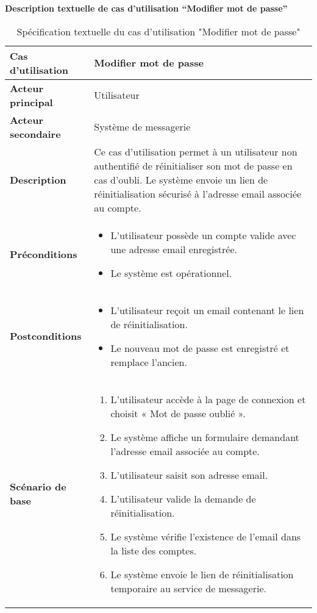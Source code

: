 \documentclass[a4paper,11pt]{report}
\begin{document}
\textbf{Description textuelle de cas d’utilisation “Modifier mot de passe”}

\begin{table}[H]
  \centering
  \renewcommand{\arraystretch}{1.5}
  \caption{Spécification textuelle du cas d'utilisation "Modifier mot de passe"}
  \begin{tabularx}{\textwidth}{|l|X|}
    \hline
    \textbf{Cas d'utilisation} & Modifier mot de passe \\ \hline
    \textbf{Acteur principal}  & Utilisateur \\ \hline
    \textbf{Acteur secondaire} & Système de messagerie \\ \hline
    \textbf{Description}       & Ce cas d'utilisation permet à un utilisateur non authentifié de réinitialiser son mot de passe en cas d'oubli. Le système envoie un lien de réinitialisation sécurisé à l'adresse email associée au compte. \\ \hline
    \textbf{Préconditions}     &
    \begin{itemize}[leftmargin=*]
      \item L’utilisateur possède un compte valide avec une adresse email enregistrée.
      \item Le système est opérationnel.
    \end{itemize} \\ \hline
    \textbf{Postconditions}    &
    \begin{itemize}[leftmargin=*]
      \item L’utilisateur reçoit un email contenant le lien de réinitialisation.
      \item Le nouveau mot de passe est enregistré et remplace l'ancien.
    \end{itemize} \\ \hline
    \textbf{Scénario de base}   &
    \begin{enumerate}[leftmargin=*]
      \item L’utilisateur accède à la page de connexion et choisit « Mot de passe oublié ».
      \item Le système affiche un formulaire demandant l’adresse email associée au compte.
      \item L’utilisateur saisit son adresse email.
      \item L’utilisateur valide la demande de réinitialisation.
      \item Le système vérifie l’existence de l’email dans la liste des comptes.
      \item Le système envoie le lien de réinitialisation temporaire au service de messagerie.

\end{enumerate}
\end{tabularx}
\end{table}
\end{document}
